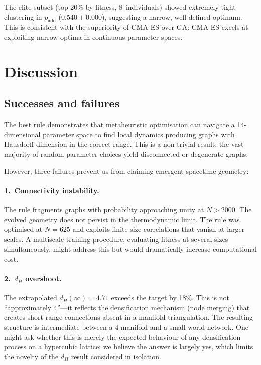 \documentclass[aps,prd,twocolumn,superscriptaddress,floatfix]{revtex4-2}
\begin{document}
The elite subset (top 20\% by fitness, 8~individuals) showed
extremely tight clustering in $p_{\mathrm{add}}$
($0.540 \pm 0.000$), suggesting a narrow, well-defined optimum.
This is consistent with the superiority of CMA-ES over GA:
CMA-ES excels at exploiting narrow optima in continuous
parameter spaces.


\section{Discussion}
\label{sec:discussion}

\subsection{Successes and failures}

The best rule demonstrates that metaheuristic optimisation can
navigate a 14-dimensional parameter space to find local dynamics
producing graphs with Hausdorff dimension in the correct range.
This is a non-trivial result: the vast majority of random
parameter choices yield disconnected or degenerate graphs.

However, three failures prevent us from claiming emergent
spacetime geometry:

\paragraph{1.~Connectivity instability.}
The rule fragments graphs with probability approaching unity
at $N > 2000$.  The evolved geometry does not persist in the
thermodynamic limit.  The rule was optimised at $N = 625$ and
exploits finite-size correlations that vanish at larger scales.
A multiscale training procedure, evaluating fitness at several
sizes simultaneously, might address this but would dramatically
increase computational cost.

\paragraph{2.~$d_H$ overshoot.}
The extrapolated $d_H(\infty) = 4.71$ exceeds the target by
18\%.  This is not ``approximately 4''---it reflects the
densification mechanism (node merging) that creates short-range
connections absent in a manifold triangulation.  The resulting
structure is intermediate between a 4-manifold and a
small-world network.  One might ask whether this is merely the
expected behaviour of any densification process on a hypercubic
lattice; we believe the answer is largely yes, which limits the
novelty of the $d_H$ result considered in isolation.
\end{document}
